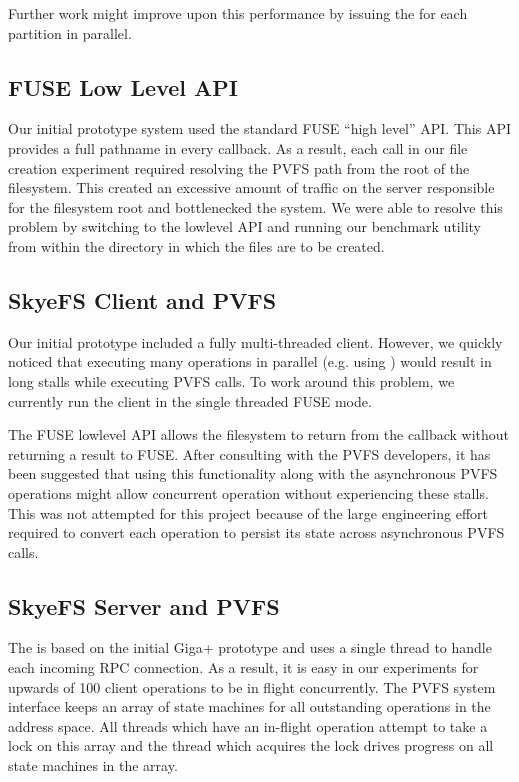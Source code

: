 \documentclass[onecolumn, 11pt, letterpaper]{article}
\begin{document}
Further work might improve upon this performance by issuing the 
for each partition in parallel.

\subsection{FUSE Low Level API}
Our initial prototype system used the standard FUSE ``high level'' API.  This
API provides a full pathname in every callback.  As a result, each
 call in our file creation experiment required resolving the PVFS
path from the root of the filesystem.  This created an excessive amount of
traffic on the server responsible for the filesystem root and bottlenecked the
system.  We were able to resolve this problem by switching to the lowlevel API
and running our benchmark utility from within the directory in which the files
are to be created.

\subsection{SkyeFS Client and PVFS}
Our initial prototype included a fully multi-threaded client.  However, we
quickly noticed that executing many operations in parallel (e.g. using
) would result in long stalls while executing PVFS calls.
To work around this problem, we currently run the client in the single
threaded FUSE mode.

The FUSE lowlevel API allows the filesystem to return from the callback
without returning a result to FUSE.  After consulting with the PVFS
developers, it has been suggested that using this functionality along with the
asynchronous PVFS operations might allow concurrent operation without
experiencing these stalls.  This was not attempted for this project because of
the large engineering effort required to convert each operation to persist its
state across asynchronous PVFS calls.

\subsection{SkyeFS Server and PVFS}
The  is based on the initial Giga+ prototype and uses a
single thread to handle each incoming RPC connection.  As a result, it is easy
in our experiments
for upwards of 100 client operations to be in flight concurrently.  The PVFS
system interface keeps an array of state machines for all outstanding
operations in the address space.  All threads which have an in-flight
operation attempt to take a lock on this array and the thread which acquires
the lock drives progress on all state machines in the array.
\end{document}

